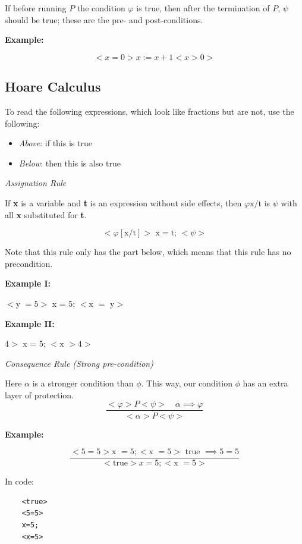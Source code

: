 If before running \(P\) the condition \(\varphi\) is true, then after the termination of \(P\), 
\(\psi\) should be true; these are the pre- and post-conditions.

\textbf{Example:}

\[
    <x=0> x:= x+1 <x>0>
\]

\subsection{Hoare Calculus}

To read the following expressions, which look like fractions but are not, use the following:

\begin{itemize}
    
    \item \emph{Above}: if this is true 
    
    \item \emph{Below}: then this is also true

\end{itemize}

\emph{Assignation Rule}

If \textbf{x} is a variable and \textbf{t} is an expression without side effects, then \(\varphi \text{x/t}\) is 
\(\psi\) with all \textbf{x} substituted for \textbf{t}.

\[
    <\varphi [\text{x/t}]> \text{ x} = \text{t; } <\psi>
\]

Note that this rule only has the part below, which means that this rule has no precondition.

\textbf{Example I:} 

\(<\text{y } = 5>\) x = 5; \(<\text{x } = \text{ y}>\)

\textbf{Example II:} 

\(<5 > 4>\) x = 5; \(<\text{x } > 4>\)


\emph{Consequence Rule (Strong pre-condition)} 

Here \(\alpha\) is a stronger condition than \(\phi\). This way, our condition \(\phi\) has an extra layer of protection.
\[
    \frac{<\varphi> P <\psi> \quad \alpha \implies \varphi}{ <\alpha> P <\psi>}
\]

\textbf{Example:} 

\[
    \frac{<5 = 5> \text{x } = 5; <\text{x } = 5> \text{ true } \implies 5 = 5}{<\text{true} > x = 5; <\text{x } = 5>}
\]

In code:

\begin{verbatim}
    <true> 
    <5=5> 
    x=5;
    <x=5>
\end{verbatim}

